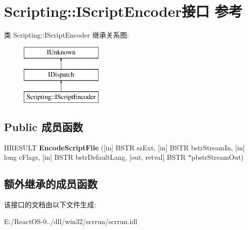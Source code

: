 \hypertarget{interface_scripting_1_1_i_script_encoder}{}\section{Scripting\+:\+:I\+Script\+Encoder接口 参考}
\label{interface_scripting_1_1_i_script_encoder}
类 Scripting\+:\+:I\+Script\+Encoder 继承关系图\+:\begin{figure}[H]
\begin{center}
\leavevmode
\includegraphics[height=3.000000cm]{interface_scripting_1_1_i_script_encoder}
\end{center}
\end{figure}
\subsection*{Public 成员函数}
\begin{DoxyCompactItemize}
\item 
\mbox{\label{interface_scripting_1_1_i_script_encoder_a3521c973676e717cbc403ea543d938cb}} 
H\+R\+E\+S\+U\+LT {\bfseries Encode\+Script\+File} (\mbox{[}in\mbox{]} B\+S\+TR sz\+Ext, \mbox{[}in\mbox{]} B\+S\+TR bstr\+Stream\+In, \mbox{[}in\mbox{]} long c\+Flags, \mbox{[}in\mbox{]} B\+S\+TR bstr\+Default\+Lang, \mbox{[}out, retval\mbox{]} B\+S\+TR $\ast$pbstr\+Stream\+Out)
\end{DoxyCompactItemize}
\subsection*{额外继承的成员函数}


该接口的文档由以下文件生成\+:\begin{DoxyCompactItemize}
\item 
E\+:/\+React\+O\+S-\/0../dll/win32/scrrun/scrrun.\+idl\end{DoxyCompactItemize}
